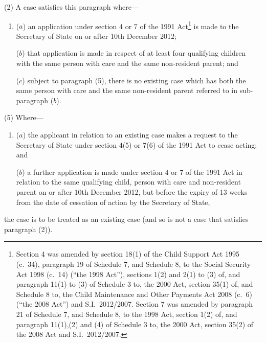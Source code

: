 \documentclass[12pt,a4paper]{article}
\begin{document}
(2) A case satisfies this paragraph where—
\begin{enumerate}\item[]
($a$) an application under section 4 or 7 of the 1991 Act\footnote{Section 4 was amended by section 18(1) of the Child Support Act 1995 (c.~34), paragraph 19 of Schedule 7, and Schedule 8, to the Social Security Act 1998 (c.~14) (“the 1998 Act”), sections 1(2) and 2(1) to (3) of, and paragraph 11(1) to (3) of Schedule 3 to, the 2000 Act, section 35(1) of, and Schedule 8 to, the Child Maintenance and Other Payments Act 2008 (c.~6) (“the 2008 Act”) and S.I.~2012/2007. Section 7 was amended by paragraph 21 of Schedule 7, and Schedule 8, to the 1998 Act, section 1(2) of, and paragraph 11(1),(2) and (4) of Schedule 3 to, the 2000 Act, section 35(2) of the 2008 Act and S.I.~2012/2007.} is made to the Secretary of State on or after 10th December 2012;

($b$) that application is made in respect of at least four qualifying children with the same person with care and the same non-resident parent; and

($c$) subject to paragraph (5), there is no existing case which has both the same person with care and the same non-resident parent referred to in sub-paragraph ($b$).
\end{enumerate}

%
%
%

(5) Where—
\begin{enumerate}\item[]
($a$) the applicant in relation to an existing case makes a request to the Secretary of State under section 4(5) or 7(6) of the 1991 Act to cease acting; and

($b$) a further application is made under section 4 or 7 of the 1991 Act in relation to the same qualifying child, person with care and non-resident parent on or after 10th December 2012, but before the expiry of 13 weeks from the date of cessation of action by the Secretary of State,
\end{enumerate}
the case is to be treated as an existing case (and so is not a case that satisfies paragraph (2)).
\end{document}
